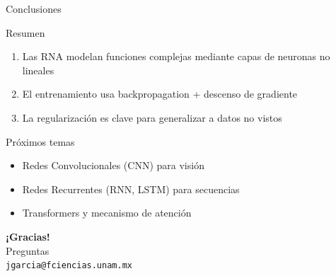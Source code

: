 \documentclass[aspectratio=169,12pt]{beamer}
\begin{document}
\begin{frame}{Conclusiones}
  \begin{block}{Resumen}
    \begin{enumerate}
      \item Las RNA modelan funciones complejas mediante capas de neuronas no lineales
      \item El entrenamiento usa backpropagation + descenso de gradiente
      \item La regularización es clave para generalizar a datos no vistos
    \end{enumerate}
  \end{block}
  \vfill
  \begin{alertblock}{Próximos temas}
    \begin{itemize}
      \item Redes Convolucionales (CNN) para visión
      \item Redes Recurrentes (RNN, LSTM) para secuencias
      \item Transformers y mecanismo de atención
    \end{itemize}
  \end{alertblock}
\end{frame}

\begin{frame}
  \centering
  \vspace{0.8cm}
  {\Huge\bfseries\color{mlblue} ¡Gracias!}\\[1em]
  {\large Preguntas}\\[2em]
  \small \texttt{jgarcia@fciencias.unam.mx}
\end{frame}
\end{document}
